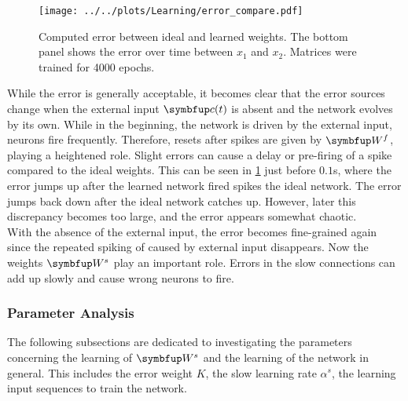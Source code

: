 \begin{figure}
	\centering
	\texttt{[image: ../../plots/Learning/error\_compare.pdf]}
	\caption{Computed error between ideal and learned weights. The bottom panel shows the error over time between $x_1$ and $x_2$. Matrices were trained for 4000 epochs.}
	\label{fig:Ws_ideal_learned_compare}
\end{figure}
While the error is generally acceptable, it becomes clear that the error sources change when the external input $\bmu{c}(t)$ is absent and the network evolves by its own. While in the beginning, the network is driven by the external input, neurons fire frequently. Therefore, resets after spikes are given by $\bmu{W}^f$, playing a heightened role. Slight errors can cause a delay or pre-firing of a spike compared to the ideal weights. This can be seen in \cref{fig:Ws_ideal_learned_compare} just before $0.1$s, where the error jumps up after the learned network fired spikes the ideal network. The error jumps back down after the ideal network catches up. However, later this discrepancy becomes too large, and the error appears somewhat chaotic.\\
With the absence of the external input, the error becomes fine-grained again since the repeated spiking of caused by external input disappears. Now the weights $\bmu{W}^s$ play an important role. Errors in the slow connections can add up slowly and cause wrong neurons to fire.\\

\subsubsection{Parameter Analysis}
The following subsections are dedicated to investigating the parameters concerning the learning of $\bmu{W}^s$ and the learning of the network in general. This includes the error weight $K$, the slow learning rate $\alpha^s$, the learning input sequences to train the network.
